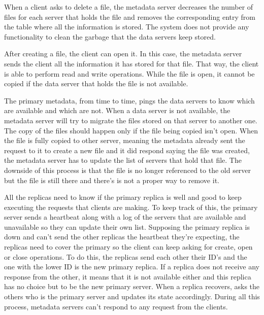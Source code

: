When a client asks to delete a file, the metadata server decreases the
number of files for each server that holds the file and removes the 
corresponding entry from the table where all the information is stored. 
The system does not provide any functionality to clean the garbage that 
the data servers keep stored.

After creating a file, the client can open it. In this case, the metadata 
server sends the client all the information it has stored for that file. 
That way, the client is able to perform read and write operations. While 
the file is open, it cannot be copied if the data server that holds the 
file is not available.

The primary metadata, from time to time, pings the data servers to know 
which are available and which are not. When a data server is not 
available, the metadata server will try to migrate the files stored on 
that server to another one. The copy of the files should happen only if 
the file being copied isn't open. When the file is fully copied to other 
server, meaning the metadata already sent the request to it to create a 
new file and it did respond saying the file was created, the metadata 
server has to update the list of servers that hold that file. The downside 
of this process is that the file is no longer referenced to the 
old server but the file is still there and there's is not a proper way 
to remove it.

All the replicas need to know if the primary replica is well and good to 
keep executing the requests that clients are making. To keep track of this, 
the primary server sends a heartbeat along with a log of the servers that 
are available and unavailable so they can update their own list. Supposing 
the primary replica is down and can't send the other replicas the heartbeat 
they're expecting, the replicas need to cover the primary so the client can 
keep asking for create, open or close operations. To do this, the replicas 
send each other their ID's and the one with the lower ID is the new primary
replica. If a replica does not receive any response from the other, it 
means that it is not available either and this replica has no choice but to 
be the new primary server. When a replica recovers, asks the others who is 
the primary server and updates its state accordingly. During all this process, 
metadata servers can't respond to any request from the clients. 